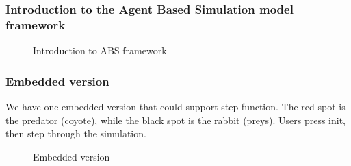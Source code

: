 \documentclass{article}
\begin{document}
\begin{normalsize}
\subsubsection{Introduction to the Agent Based Simulation model framework}
\begin{figure}[H]
	\caption{Introduction to ABS framework}
\end{figure}
\subsubsection{Embedded version}
We have one embedded version that could support step function. The red spot is the predator (coyote), while the black spot is the rabbit (preys). Users press init, then step through the simulation.
\begin{figure}[H]
	\caption{Embedded version}
	\end{figure}

\end{normalsize}
\end{document}
